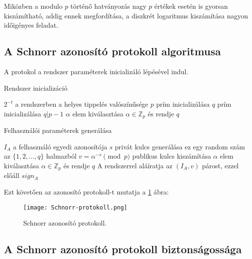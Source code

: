 Miközben a modulo $p$ történő hatványozás nagy $p$ értékek esetén is gyorsan kiszámítható, addig ennek megfordítása, a diszkrét logaritmus kiszámítása nagyon időigényes feladat.

\subsection*{A Schnorr azonosító protokoll algoritmusa}

A protokol a rendszer paraméterek inicializáló lépésével indul.

\begin{algorithm}[H]
    \caption{Rendszer inicializáció}
    \label{algorithm:systemInit}
    \begin{algorithmic}
         \Comment $2^{-t}$ a rendszerben a helyes tippelés valószínűsége
        \State $p$ prím inicializálása
        \State $q$ prím inicializálása \Comment $q | p-1$
        \State $\alpha$ elem kiválasztása \Comment $\alpha \in \mathbb{Z}_{p}$ és rendje $q$
        \EndProcedure
    \end{algorithmic}
\end{algorithm}

\begin{algorithm}[H]
    \caption{Felhasználói paraméterek generálása}
    \label{algorithm:userInit}
    \begin{algorithmic}
         \Comment $I_{A}$ a felhasználó egyedi azonosítója
        \State $s$ privát kulcs generálása \Comment ez egy random szám az $\{1,2,...,q\}$ halmazból
        \State $v = \alpha^{-s} \pmod{p}$ publikus kulcs kiszámítása
        \State $\alpha$ elem kiválasztása \Comment $\alpha \in \mathbb{Z}_{p}$ és rendje $q$
        \State A rendszerrel aláíratja az $(I_{A}, v)$ párost, ezzel előáll $sign_{A}$
        \EndProcedure
    \end{algorithmic}
\end{algorithm}

Ezt követően az azonosító protokoll-t mutatja a \ref{Figure::SchnorrProt} ábra:

\begin{figure}[H]
    \centering
    \texttt{[image: Schnorr-protokoll.png]}
    \caption{Schnorr azonosító protokoll.}
    \label{Figure::SchnorrProt}
\end{figure}

\subsection*{A Schnorr azonosító protokoll biztonságossága}

